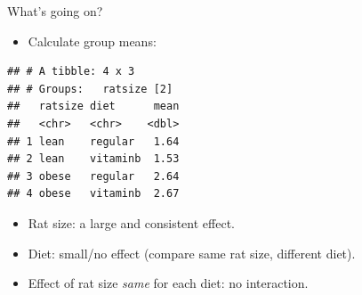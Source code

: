 \documentclass[ignorenonframetext,]{beamer}
\newenvironment{Shaded}{\begin{snugshade}}{\end{snugshade}}
\newcommand{\DataTypeTok}[1]{\textcolor[rgb]{0.13,0.29,0.53}{#1}}
\newcommand{\KeywordTok}[1]{\textcolor[rgb]{0.13,0.29,0.53}{\textbf{#1}}}
\newcommand{\NormalTok}[1]{#1}
\newcommand{\OperatorTok}[1]{\textcolor[rgb]{0.81,0.36,0.00}{\textbf{#1}}}
\newcommand{\StringTok}[1]{\textcolor[rgb]{0.31,0.60,0.02}{#1}}
\providecommand{\tightlist}{%
  \setlength{\itemsep}{0pt}\setlength{\parskip}{0pt}}
\begin{document}
\begin{frame}[fragile]{What's going on?}
\protect\hypertarget{whats-going-on}{}

\begin{itemize}
\tightlist
\item
  Calculate group means:
\end{itemize}

\footnotesize

\begin{Shaded}
\end{Shaded}

\begin{verbatim}
## # A tibble: 4 x 3
## # Groups:   ratsize [2]
##   ratsize diet      mean
##   <chr>   <chr>    <dbl>
## 1 lean    regular   1.64
## 2 lean    vitaminb  1.53
## 3 obese   regular   2.64
## 4 obese   vitaminb  2.67
\end{verbatim}

\normalsize

\begin{itemize}
\item
  Rat size: a large and consistent effect.
\item
  Diet: small/no effect (compare same rat size, different diet).
\item
  Effect of rat size \emph{same} for each diet: no interaction.
\end{itemize}

\end{frame}
\end{document}
